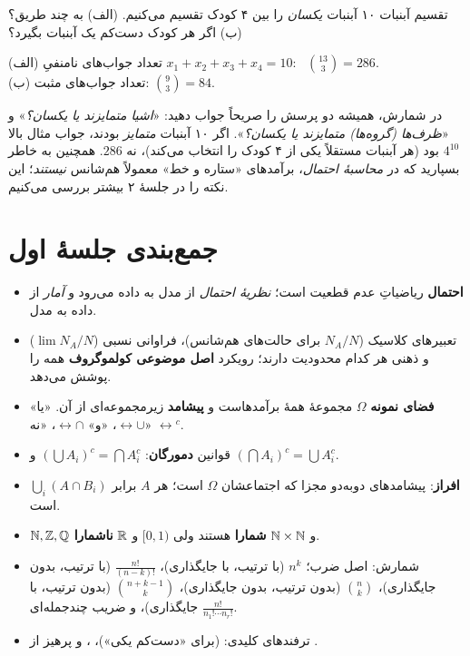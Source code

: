 \begin{example}{تقسیم آبنبات}
۱۰ آبنبات \emph{یکسان} را بین ۴ کودک تقسیم می‌کنیم. (الف) به چند طریق؟ (ب) اگر هر کودک دست‌کم یک آبنبات بگیرد؟
\begin{solution}
(الف) تعداد جواب‌های نامنفیِ $x_1+x_2+x_3+x_4=10$: \ $\binom{13}{3}=286$. \\
(ب) تعداد جواب‌های مثبت: $\binom{9}{3}=84$.
\end{solution}
\end{example}

\begin{warning}
در شمارش، همیشه دو پرسش را صریحاً جواب دهید: «\emph{اشیا متمایزند یا یکسان؟}» و «\emph{ظرف‌ها (گروه‌ها) متمایزند یا یکسان؟}». اگر ۱۰ آبنبات \emph{متمایز} بودند، جواب مثال بالا $4^{10}$ بود (هر آبنبات مستقلاً یکی از ۴ کودک را انتخاب می‌کند)، نه $286$.
همچنین به خاطر بسپارید که در \emph{محاسبهٔ احتمال}، برآمدهای «ستاره و خط» معمولاً هم‌شانس \emph{نیستند}؛ این نکته را در جلسهٔ ۲ بیشتر بررسی می‌کنیم.
\end{warning}

\section*{جمع‌بندی جلسهٔ اول}

\begin{summary}
\begin{itemize}
  \item \textbf{احتمال} ریاضیاتِ عدم قطعیت است؛ \emph{نظریهٔ احتمال} از مدل به داده می‌رود و \emph{آمار} از داده به مدل.
  \item تعبیرهای کلاسیک ($N_A/N$ برای حالت‌های هم‌شانس)، فراوانی نسبی ($\lim N_A/N$) و ذهنی هر کدام محدودیت دارند؛ رویکرد \textbf{اصل موضوعی کولموگروف} همه را پوشش می‌دهد.
  \item \textbf{فضای نمونه} $\Omega$ مجموعهٔ همهٔ برآمدهاست و \textbf{پیشامد} زیرمجموعه‌ای از آن. «یا» $\leftrightarrow\cup$، «و» $\leftrightarrow\cap$، «نه» $\leftrightarrow{}^c$.
  \item قوانین \textbf{دمورگان}: $(\bigcup A_i)^c=\bigcap A_i^c$ و $(\bigcap A_i)^c=\bigcup A_i^c$.
  \item \textbf{افراز}: پیشامدهای دوبه‌دو مجزا که اجتماعشان $\Omega$ است؛ هر $A$ برابر $\bigcup_i(A\cap B_i)$ است.
  \item $\mathbb{N},\mathbb{Z},\mathbb{Q}$ و $\mathbb{N}\times\mathbb{N}$ \textbf{شمارا} هستند ولی $[0,1)$ و $\mathbb{R}$ \textbf{ناشمارا}.
  \item شمارش: اصل ضرب؛ $n^k$ (با ترتیب، با جایگذاری)، $\frac{n!}{(n-k)!}$ (با ترتیب، بدون جایگذاری)، $\binom nk$ (بدون ترتیب، بدون جایگذاری)، $\binom{n+k-1}{k}$ (بدون ترتیب، با جایگذاری)، و ضریب چندجمله‌ای $\frac{n!}{n_1!\cdots n_r!}$.
  \item ترفندهای کلیدی:  (برای «دست‌کم یکی»)، ، و پرهیز از .
\end{itemize}
\end{summary}


